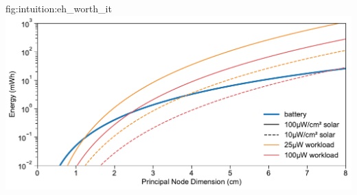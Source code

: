 \begin{definefigure}{fig:intuition:eh_worth_it}
  \centering
  \includegraphics[width=\columnwidth]{figs/is_eh_worth_it_micro.pdf}
  \caption{
  A comparison of preallocated energy and captured energy. Note the logarithmic y-axis scale.
  This figure compares the energy offered by a cubic battery with that of potential harvestable energy captured by a square photovoltaic over the lifetime of the battery.
  At a sufficient size and in sufficient harvesting conditions, while powering an appropriate workload, solar energy-harvesting can provide more energy over the same time frame as a lithium battery.
  }
\end{definefigure}

